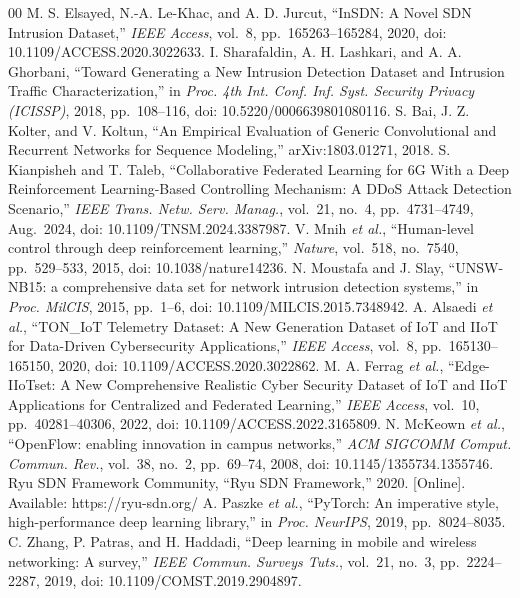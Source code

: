 \documentclass[conference,a4paper]{IEEEtran}
\begin{document}
\begin{thebibliography}{00}
 M. S. Elsayed, N.-A. Le-Khac, and A. D. Jurcut, ``InSDN: A Novel SDN Intrusion Dataset,'' \textit{IEEE Access}, vol.~8, pp.~165263--165284, 2020, doi: 10.1109/ACCESS.2020.3022633.
 I. Sharafaldin, A. H. Lashkari, and A. A. Ghorbani, ``Toward Generating a New Intrusion Detection Dataset and Intrusion Traffic Characterization,'' in \textit{Proc. 4th Int. Conf. Inf. Syst. Security Privacy (ICISSP)}, 2018, pp.~108--116, doi: 10.5220/0006639801080116.
 S. Bai, J. Z. Kolter, and V. Koltun, ``An Empirical Evaluation of Generic Convolutional and Recurrent Networks for Sequence Modeling,'' arXiv:1803.01271, 2018.
 S. Kianpisheh and T. Taleb, ``Collaborative Federated Learning for 6G With a Deep Reinforcement Learning-Based Controlling Mechanism: A DDoS Attack Detection Scenario,'' \textit{IEEE Trans. Netw. Serv. Manag.}, vol.~21, no.~4, pp.~4731--4749, Aug.~2024, doi: 10.1109/TNSM.2024.3387987.
 V. Mnih \textit{et al.}, ``Human-level control through deep reinforcement learning,'' \textit{Nature}, vol.~518, no.~7540, pp.~529--533, 2015, doi: 10.1038/nature14236.
 N. Moustafa and J. Slay, ``UNSW-NB15: a comprehensive data set for network intrusion detection systems,'' in \textit{Proc. MilCIS}, 2015, pp.~1--6, doi: 10.1109/MILCIS.2015.7348942.
 A. Alsaedi \textit{et al.}, ``TON\_IoT Telemetry Dataset: A New Generation Dataset of IoT and IIoT for Data-Driven Cybersecurity Applications,'' \textit{IEEE Access}, vol.~8, pp.~165130--165150, 2020, doi: 10.1109/ACCESS.2020.3022862.
 M. A. Ferrag \textit{et al.}, ``Edge-IIoTset: A New Comprehensive Realistic Cyber Security Dataset of IoT and IIoT Applications for Centralized and Federated Learning,'' \textit{IEEE Access}, vol.~10, pp.~40281--40306, 2022, doi: 10.1109/ACCESS.2022.3165809.
 N. McKeown \textit{et al.}, ``OpenFlow: enabling innovation in campus networks,'' \textit{ACM SIGCOMM Comput. Commun. Rev.}, vol.~38, no.~2, pp.~69--74, 2008, doi: 10.1145/1355734.1355746.
 Ryu SDN Framework Community, ``Ryu SDN Framework,'' 2020. [Online]. Available: https://ryu-sdn.org/
 A. Paszke \textit{et al.}, ``PyTorch: An imperative style, high-performance deep learning library,'' in \textit{Proc. NeurIPS}, 2019, pp.~8024--8035.
 C. Zhang, P. Patras, and H. Haddadi, ``Deep learning in mobile and wireless networking: A survey,'' \textit{IEEE Commun. Surveys Tuts.}, vol.~21, no.~3, pp.~2224--2287, 2019, doi: 10.1109/COMST.2019.2904897.

\end{thebibliography}
\end{document}
